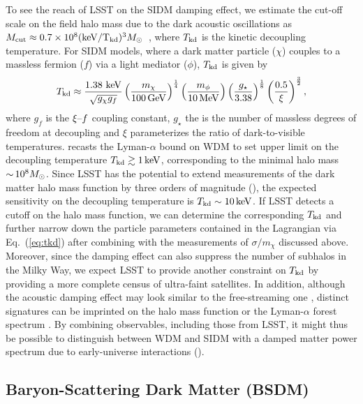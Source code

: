 To see the reach of LSST on the SIDM damping effect, we estimate the cut-off scale on the field halo mass due to the dark acoustic oscillations as $M_{\rm cut}\approx0.7\times10^{8}({\rm keV/T_{\rm kd}})^3 M_\odot$~\citep{1512.05349}, where $T_{\rm kd}$ is the kinetic decoupling temperature. For SIDM models, where a dark matter particle ($\chi$) couples to a massless fermion ($f$) via a light mediator ($\phi$), $T_{\rm kd}$ is given by~\citep{Aarssen:2012fx,Cyr-Racine:2015ihg}
\begin{equation}
T_{\rm kd}\approx\frac{1.38~{\rm keV}}{\sqrt{g_\chi g_f}}\left(\frac{m_\chi}{100 \mathrm{\,GeV}}\right)^{\frac{1}{4}}\left(\frac{m_\phi}{10 \mathrm{\,MeV}}\right)\left(\frac{g_\star}{3.38}\right)^{\frac{1}{8}}\left(\frac{0.5}{\xi}\right)^{\frac{3}{2}},
\label{eq:tkd}
\end{equation}
where $g_f$ is the $\xi\textup{--}f$ coupling constant, $g_\star$ the is the number of massless degrees of freedom at decoupling and $\xi$ parameterizes the ratio of dark-to-visible temperatures. \citet{Huo:2017vef} recasts the Lyman-$\alpha$ bound on WDM to set upper limit on the decoupling temperature $T_{\rm kd}\gtrsim 1 \mathrm{\,keV}$, corresponding to the minimal halo mass $ {\sim}\, 10^8 M_\odot$. Since LSST has the potential to extend measurements of the dark matter halo mass function by three orders of magnitude (), the expected sensitivity on the decoupling temperature is $T_{\rm kd}\sim 10 \mathrm{\,keV}$. If LSST detects a cutoff on the halo mass function, we can determine the corresponding $T_{\rm kd}$ and further narrow down the particle parameters contained in the Lagrangian via Eq.~(\ref{eq:tkd}) after combining with the measurements of $\sigma/m_\chi$ discussed above. Moreover, since the damping effect can also suppress the number of subhalos in the Milky Way, we expect LSST to provide another constraint on $T_{\rm kd}$ by providing a more complete census of ultra-faint satellites. In addition, although the acoustic damping effect may look similar to the free-streaming one \citep[\eg][]{1512.05349}, distinct signatures can be imprinted on the halo mass function \citep{Buckley:2014ab,Sameie:2018juk} or the Lyman-$\alpha$ forest spectrum \citep{Krall:2017xcw,Bose:2018juc}. By combining observables, including those from LSST, it might thus be possible to distinguish between WDM and SIDM with a damped matter power spectrum due to early-universe interactions ().

     
\subsection{Baryon-Scattering Dark Matter (BSDM) }
\label{sec:bsdm}

